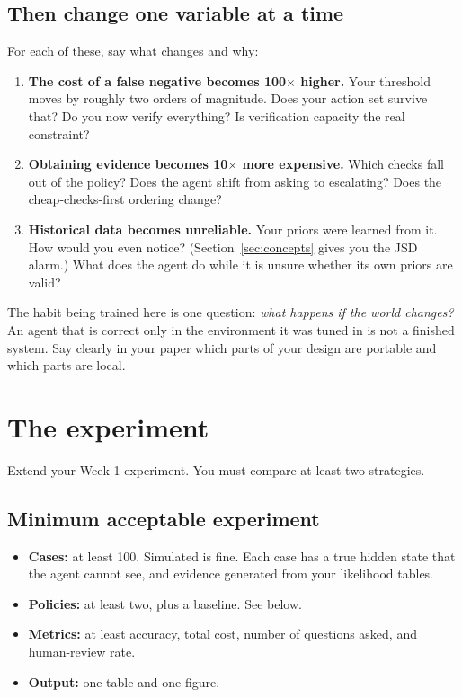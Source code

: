 \documentclass[11pt,a4paper]{article}
\begin{document}
\subsection{Then change one variable at a time}

For each of these, say what changes and why:

\begin{enumerate}
  \item \textbf{The cost of a false negative becomes 100$\times$ higher.} Your threshold moves by
        roughly two orders of magnitude. Does your action set survive that? Do you now verify
        everything? Is verification capacity the real constraint?
  \item \textbf{Obtaining evidence becomes 10$\times$ more expensive.} Which checks fall out of the
        policy? Does the agent shift from asking to escalating? Does the cheap-checks-first
        ordering change?
  \item \textbf{Historical data becomes unreliable.} Your priors were learned from it. How would
        you even notice? (Section~\ref{sec:concepts} gives you the JSD alarm.) What does the agent
        do while it is unsure whether its own priors are valid?
\end{enumerate}

The habit being trained here is one question: \emph{what happens if the world changes?} An agent
that is correct only in the environment it was tuned in is not a finished system. Say clearly in
your paper which parts of your design are portable and which parts are local.

\section{The experiment}
\label{sec:experiment}

Extend your Week 1 experiment. You must compare at least two strategies.

\subsection{Minimum acceptable experiment}

\begin{itemize}
  \item \textbf{Cases:} at least 100. Simulated is fine. Each case has a true hidden state that the
        agent cannot see, and evidence generated from your likelihood tables.
  \item \textbf{Policies:} at least two, plus a baseline. See below.
  \item \textbf{Metrics:} at least accuracy, total cost, number of questions asked, and
        human-review rate.
  \item \textbf{Output:} one table and one figure.
\end{itemize}
\end{document}

